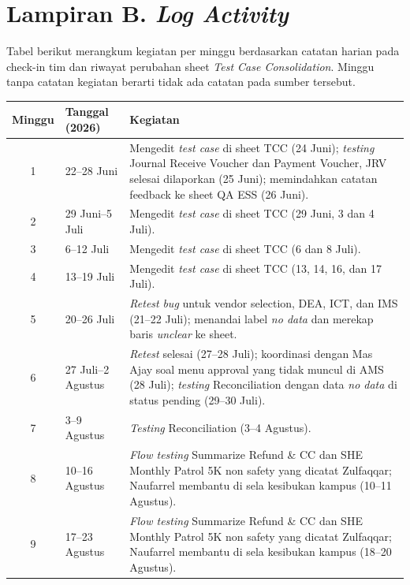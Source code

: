 \clearpage
\chapter*{Lampiran B. \textit{Log Activity}}
\label{app:log}

Tabel berikut merangkum kegiatan per minggu berdasarkan catatan harian pada check-in tim dan riwayat perubahan sheet \textit{Test Case Consolidation}. Minggu tanpa catatan kegiatan berarti tidak ada catatan pada sumber tersebut.

\begin{center}
\small
\begin{longtable}{|c|p{3.3cm}|p{7.5cm}|}
\hline
\textbf{Minggu} & \textbf{Tanggal (2026)} & \textbf{Kegiatan} \\
\hline
\endhead
1 & 22--28 Juni & Mengedit \textit{test case} di sheet TCC (24 Juni); \textit{testing} Journal Receive Voucher dan Payment Voucher, JRV selesai dilaporkan (25 Juni); memindahkan catatan feedback ke sheet QA ESS (26 Juni). \\
\hline
2 & 29 Juni--5 Juli & Mengedit \textit{test case} di sheet TCC (29 Juni, 3 dan 4 Juli). \\
\hline
3 & 6--12 Juli & Mengedit \textit{test case} di sheet TCC (6 dan 8 Juli). \\
\hline
4 & 13--19 Juli & Mengedit \textit{test case} di sheet TCC (13, 14, 16, dan 17 Juli). \\
\hline
5 & 20--26 Juli & \textit{Retest} \textit{bug} untuk vendor selection, DEA, ICT, dan IMS (21--22 Juli); menandai label \textit{no data} dan merekap baris \textit{unclear} ke sheet. \\
\hline
6 & 27 Juli--2 Agustus & \textit{Retest} selesai (27--28 Juli); koordinasi dengan Mas Ajay soal menu approval yang tidak muncul di AMS (28 Juli); \textit{testing} Reconciliation dengan data \textit{no data} di status pending (29--30 Juli). \\
\hline
7 & 3--9 Agustus & \textit{Testing} Reconciliation (3--4 Agustus). \\
\hline
8 & 10--16 Agustus & \textit{Flow testing} Summarize Refund \& CC dan SHE Monthly Patrol 5K non safety yang dicatat Zulfaqqar; Naufarrel membantu di sela kesibukan kampus (10--11 Agustus). \\
\hline
9 & 17--23 Agustus & \textit{Flow testing} Summarize Refund \& CC dan SHE Monthly Patrol 5K non safety yang dicatat Zulfaqqar; Naufarrel membantu di sela kesibukan kampus (18--20 Agustus). \\

\end{longtable}
\end{center}
